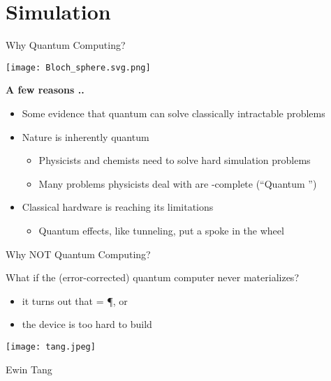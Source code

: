\section{Simulation}



\begin{frame}{Why Quantum Computing?}

\centering
\texttt{[image: Bloch\_sphere.svg.png]}


	\begin{block}{\bf A few reasons ..}
		\begin{itemize}
		\item Some evidence that quantum can solve classically intractable problems
  		\item Nature is inherently quantum
		\begin{itemize}
  		\item Physicists and chemists need to solve hard simulation problems
  		\item Many problems physicists deal with are \QMA-complete (``Quantum \NP'')
		\end{itemize}
		\item Classical hardware is reaching its limitations
		\begin{itemize}
  		\item Quantum effects, like tunneling, put a spoke in the wheel
		\end{itemize}
		\end{itemize}
	\end{block}

\end{frame}


\begin{frame}{Why NOT Quantum Computing?}
\begin{refsection}

\vfill

\begin{alertblock}{What if the (error-corrected) quantum computer never materializes?}
		\begin{itemize}
		\item it turns out that \BQP{} = \P, or
		\item the device is too hard to build
		\end{itemize}
\end{alertblock}

\centering


\texttt{[image: tang.jpeg]}

 Ewin Tang~\cite{tang2019quantum}



\vfill
\printbibliography[section=\therefsection]

\end{refsection}
\end{frame}





